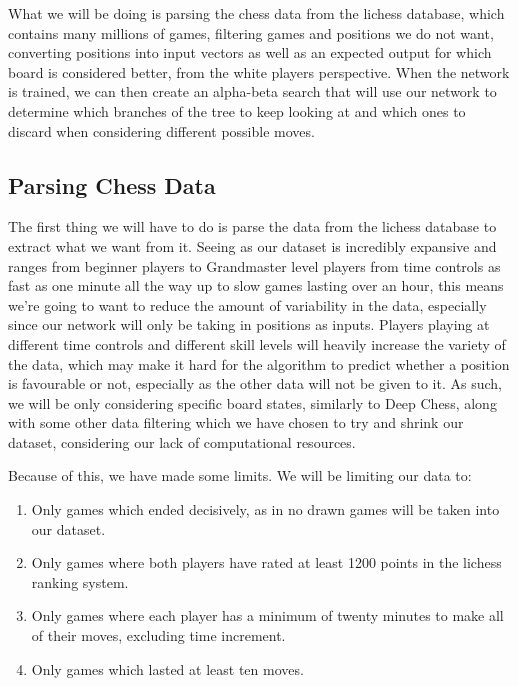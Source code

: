\documentclass[12pt]{article}
\begin{document}
    What we will be doing is parsing the chess data from the lichess database, which contains many millions of games, filtering games and positions we do not want, converting positions into input vectors as well as an expected output for which board is considered better, from the white players perspective. When the network is trained, we can then create an alpha-beta search that will use our network to determine which branches of the tree to keep looking at and which ones to discard when considering different possible moves.

    \subsection{Parsing Chess Data}

    The first thing we will have to do is parse the data from the lichess database to extract what we want from it. Seeing as our dataset is incredibly expansive and ranges from beginner players to Grandmaster level players from time controls as fast as one minute all the way up to slow games lasting over an hour, this means we're going to want to reduce the amount of variability in the data, especially since our network will only be taking in positions as inputs. Players playing at different time controls and different skill levels will heavily increase the variety of the data, which may make it hard for the algorithm to predict whether a position is favourable or not, especially as the other data will not be given to it. As such, we will be only considering specific board states, similarly to Deep Chess, along with some other data filtering which we have chosen to try and shrink our dataset, considering our lack of computational resources.

    Because of this, we have made some limits. We will be limiting our data to:
    \begin{enumerate}
        \item Only games which ended decisively, as in no drawn games will be taken into our dataset. 
        \item Only games where both players have rated at least 1200 points in the lichess ranking system.
        \item Only games where each player has a minimum of twenty minutes to make all of their moves, excluding time increment.
        \item Only games which lasted at least ten moves.
    \end{enumerate}
\end{document}
